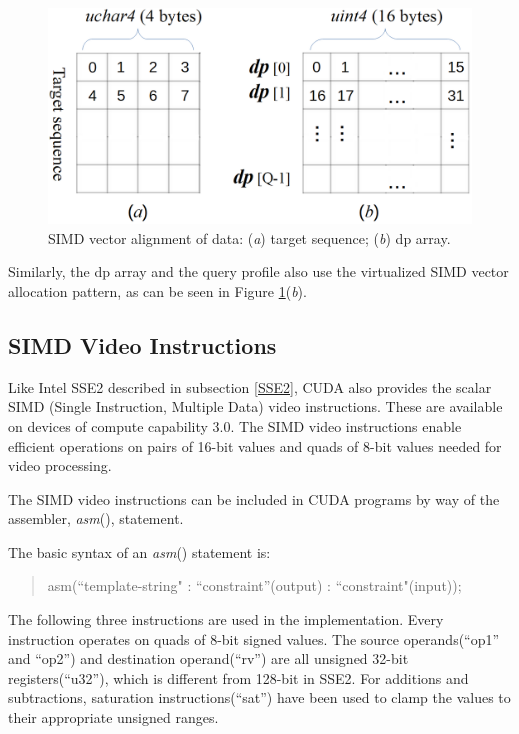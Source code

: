 \begin{figure}[!htb]
	\centering
	\includegraphics[totalheight=0.2\textheight]{Figures/simdvector.png}
	\caption{\selectfont SIMD vector alignment of data: (\textit{a}) target sequence; (\textit{b}) dp array.}
	\label{fig:simdvector}
\end{figure}

Similarly, the dp array and the query profile also use the virtualized SIMD vector allocation pattern, as can be seen in Figure \ref{fig:simdvector}(\textit{b}).

\subsection{SIMD Video Instructions}
\label{video}

Like Intel SSE2 described in subsection \ref{SSE2}, CUDA also provides the scalar SIMD (Single Instruction, Multiple Data) video instructions. These are available on devices of compute capability 3.0. The SIMD video instructions enable efficient operations on pairs of 16-bit values and quads of 8-bit values needed for video processing.

The SIMD video instructions can be included in CUDA programs by way of the assembler, \emph{asm}(), statement.

The basic syntax of an \emph{asm}() statement is:

\begin{quote}
\selectfont
 asm(``template-string" : ``constraint''(output) : ``constraint"(input));
\end{quote}

The following three instructions are used in the implementation. Every instruction operates on quads of 8-bit signed values. The source operands(“op1” and “op2”) and destination operand(“rv”) are all unsigned 32-bit registers(“u32”), which is different from 128-bit in SSE2. For additions and subtractions, saturation instructions(“sat”) have been used to clamp the values to their appropriate unsigned ranges.

